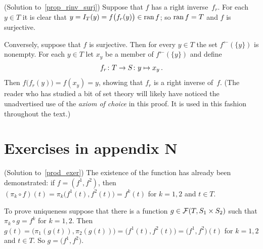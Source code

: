 \begin{prf}\label{sol_prop_rinv_surj}(Solution to~\ref{prop_rinv_surj})
Suppose that $f$ has a right inverse~$f_r$. For each $y \in T$ it is clear that $y = I_T(y) =
f\bigl(f_r(y)\bigr) \in \operatorname{ran} f$; so $\operatorname{ran} f = T$ and $f$ is surjective.

Conversely, suppose that $f$ is surjective. Then for every $y \in T$ the set
$f^{\gets}(\{y\})$ is nonempty. For each $y \in T$ let $x_y$ be a member of $f^{\gets}(\{y\})$
and define
 \[ f_r\colon T \rightarrow S\colon y \mapsto x_y\,. \]
Then $f\bigl(f_r(y)\bigr) = f(x_y) = y$, showing that $f_r$ is a right inverse of~$f$.
(The reader who has studied a bit of set theory will likely have noticed the unadvertised
use of the
\emph{axiom of choice} in this proof. It is used in this fashion throughout the text.)
\end{prf}






















\section{Exercises in appendix N}

\begin{prf}\label{sol_prod_exer}(Solution to~\ref{prod_exer})
The existence of the function has already been demonstrated: if $f = (f^1,f^2)$, then $(\pi_k
\circ f)(t) = \pi_k\bigl(f^1(t),f^2(t)\bigr) = f^k(t)$ for $k = 1,2$ and $t \in T$.

To prove uniqueness suppose that there is a function $g \in \mathcal{F}(T,S_1 \times S_2)$ such
that $\pi_k \circ g = f^k$ for $k = 1,2$. Then $g(t) = \bigl(\pi_1(g(t)), \pi_2(g(t))\bigr) =
\bigl(f^1(t),f^2(t)\bigr) = \bigl(f^1,f^2\bigr)(t)$ for $k = 1,2$ and $t \in T$.  So $g =
\bigl(f^1,f^2\bigr)$.
\end{prf}

























